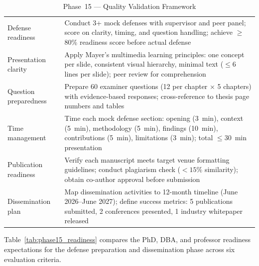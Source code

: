 \begingroup\singlespacing\tablefontsize\tablestripes
\begin{xltabular}{\textwidth}{@{} l X @{}}
\caption{Phase~15 --- Quality Validation Framework}
\label{tab:phase15_quality}\\
\toprule
{} &  \\
\midrule
\endfirsthead
\endhead
\bottomrule
\endlastfoot
Defense readiness        & Conduct 3+ mock defenses with supervisor and peer panel; score on clarity, timing, and question handling; achieve $\geq$80\% readiness score before actual defense \\
\addlinespace
Presentation clarity     & Apply Mayer's multimedia learning principles: one concept per slide, consistent visual hierarchy, minimal text ($\leq$6 lines per slide); peer review for comprehension \\
\addlinespace
Question preparedness    & Prepare 60 examiner questions (12 per chapter $\times$ 5 chapters) with evidence-based responses; cross-reference to thesis page numbers and tables \\
\addlinespace
Time management          & Time each mock defense section: opening (3~min), context (5~min), methodology (5~min), findings (10~min), contributions (5~min), limitations (3~min); total $\leq$30~min presentation \\
\addlinespace
Publication readiness    & Verify each manuscript meets target venue formatting guidelines; conduct plagiarism check ($< 15\%$ similarity); obtain co-author approval before submission \\
\addlinespace
Dissemination plan       & Map dissemination activities to 12-month timeline (June 2026--June 2027); define success metrics: 5 publications submitted, 2 conferences presented, 1 industry whitepaper released \\
\end{xltabular}
\endgroup

\vspace{1.5em}

Table~\ref{tab:phase15_readiness} compares the PhD, DBA, and professor readiness expectations for the defense preparation and dissemination phase across six evaluation criteria.

